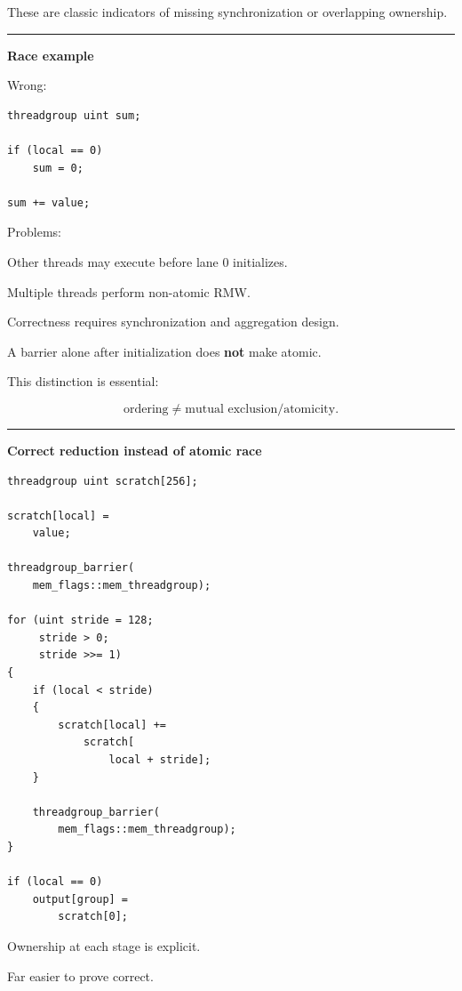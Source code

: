 These are classic indicators of missing synchronization or overlapping ownership.

\begin{center}\rule{0.5\linewidth}{0.5pt}\end{center}

\textbf{Race example}

Wrong:

\protect{}\label{p10-race}%
\begin{verbatim}
threadgroup uint sum;

if (local == 0)
    sum = 0;

sum += value;
\end{verbatim}

Problems:

Other threads may execute before lane 0 initializes.

Multiple threads perform non-atomic RMW.

Correctness requires synchronization and aggregation design.

A barrier alone after initialization does \textbf{not} make  atomic.

This distinction is essential:

\[
\boxed{
\text{ordering}
\neq
\text{mutual exclusion/atomicity}.
}
\]

\begin{center}\rule{0.5\linewidth}{0.5pt}\end{center}

\textbf{Correct reduction instead of atomic race}

\protect{}\label{p10-correct-reduction}%
\begin{verbatim}
threadgroup uint scratch[256];

scratch[local] =
    value;

threadgroup_barrier(
    mem_flags::mem_threadgroup);

for (uint stride = 128;
     stride > 0;
     stride >>= 1)
{
    if (local < stride)
    {
        scratch[local] +=
            scratch[
                local + stride];
    }

    threadgroup_barrier(
        mem_flags::mem_threadgroup);
}

if (local == 0)
    output[group] =
        scratch[0];
\end{verbatim}

Ownership at each stage is explicit.

Far easier to prove correct.

